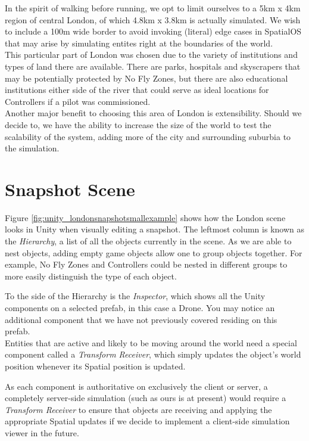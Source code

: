 \documentclass[a4paper,11pt,titlepage]{report}
\begin{document}
In the spirit of walking before running, we opt to limit ourselves to a 5km x 4km region of central London, of which 4.8km x 3.8km is actually simulated. We wish to include a 100m wide border to avoid invoking (literal) edge cases in SpatialOS that may arise by simulating entites right at the boundaries of the world.\\

This particular part of London was chosen due to the variety of institutions and types of land there are available. There are parks, hospitals and skyscrapers that may be potentially protected by No Fly Zones, but there are also educational institutions either side of the river that could serve as ideal locations for Controllers if a pilot was commissioned.\\

Another major benefit to choosing this area of London is extensibility. Should we decide to, we have the ability to increase the size of the world to test the scalability of the system, adding more of the city and surrounding suburbia to the simulation.

\section{Snapshot Scene}
Figure \ref{fig:unity_londonsnapshotsmallexample} shows how the London scene looks in Unity when visually editing a snapshot. The leftmost column is known as the \textit{Hierarchy}, a list of all the objects currently in the scene. As we are able to nest objects, adding empty game objects allow one to group objects together. For example, No Fly Zones and Controllers could be nested in different groups to more easily distinguish the type of each object.

\clearpage
To the side of the Hierarchy is the \textit{Inspector}, which shows all the Unity components on a selected prefab, in this case a Drone. You may notice an additional component that we have not previously covered residing on this prefab.\\

Entities that are active and likely to be moving around the world need a special component called a \textit{Transform Receiver}, which simply updates the object's world position whenever its Spatial position is updated.

As each component is authoritative on exclusively the client or server, a completely server-side simulation (such as ours is at present) would require a \textit{Transform Receiver} to ensure that objects are receiving and applying the appropriate Spatial updates if we decide to implement a client-side simulation viewer in the future.
\end{document}
